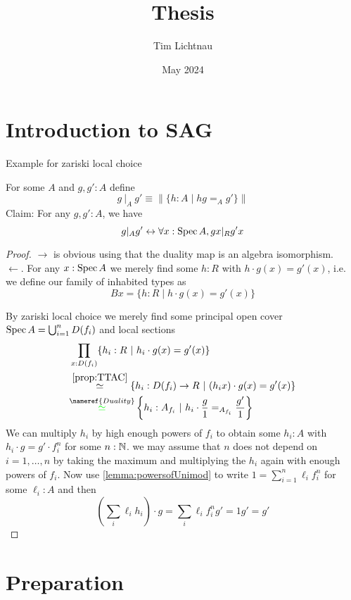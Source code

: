 \documentclass{article}
\title{Thesis}
\author{Tim Lichtnau }
\date{May 2024}
\begin{document}
\newtheorem*{warning}{Warning}
\newtheorem*{why}{Why I did it this way}
\newtheorem*{think}{Think about}
\maketitle
\tableofcontents

\section{Introduction to SAG}

Example for zariski local choice

\begin{example}{\label{ex:Divisibility}}
	For some $A$ and $g,g' : A$ define
	\[
	g \ |_A \ g' \equiv \| \{ h : A \mid h g =_A g' \} \|
	\]
	Claim: For any $g,g' : A$, we have 
	\[
	g |_{A} g' \leftrightarrow \forall x : \operatorname{Spec} A , g x |_R g' x
	\]
\end{example}
\begin{proof}
	$\rightarrow$ is obvious using that the duality map is an algebra isomorphism.\\
	$\leftarrow$. For any $x : \operatorname{Spec} A$ we merely find some $h : R$ with $h \cdot g(x) = g'(x)$, i.e. we define our family of inhabited types as 
	\[
	B x =  \{h  : R \mid  h \cdot g(x) = g'(x) \}
	\]
	
	By zariski local choice we merely find some principal open cover $\operatorname{Spec} A = \bigcup_{i=1}^n D(f_i)$ and local sections
	\begin{align*}
		&\prod_{x : D(f_i)} \{h_i  : R \mid h_i \cdot g(x) = g'(x) \} \\
		&\overset{\ref{prop:TTAC}}{\simeq} \{h_i : D(f_i) \to R \mid (h_i x) \cdot g(x) = g'(x) \}\\
		&\overset{ \nameref{Duality}}{{\color{green} \simeq}} \left\{h_i : A_{f_i} \mid h_i \cdot \frac{g}{1} =_{A_{f_i}} \frac{g'}{1} \right \}   
	\end{align*}
	We can multiply $h_i$ by high enough powers of $f_i$ to obtain some $h_i : A$ with $h_i \cdot g = g' \cdot f_i^{n}$ for some $n : \mathbb{N}$. we may assume that $n$ does not depend on $i = 1 , \hdots, n$ by taking the maximum and multiplying the $h_i$ again with enough powers of $f_i$. Now use \ref{lemma:powersofUnimod} to write $ 1 = \sum_{i=1}^n \ell_i f_i^n$ for some $\ell_i : A$ and then \[
	(\sum_i \ell_i h_i) \cdot g = \sum_i \ell_i f_i^n g' = 1 g' = g'
	\]    
\end{proof}

\section{Preparation}
\end{document}
